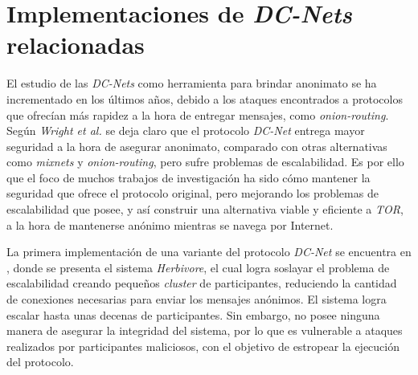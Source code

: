 \section{Implementaciones de \emph{DC-Nets} relacionadas}

El estudio de las \emph{DC-Nets} como herramienta para brindar anonimato se ha 
incrementado en los últimos años, debido a los ataques 
encontrados a protocolos que ofrecían más rapidez a la hora de entregar 
mensajes, como \emph{onion-routing}. Según \emph{Wright et al.} 
\cite{wright2002analysis} se deja claro que el protocolo \emph{DC-Net} entrega 
mayor seguridad a la hora de asegurar anonimato, comparado con otras 
alternativas como \emph{mixnets} y \emph{onion-routing}, 
pero sufre problemas de escalabilidad. Es por ello que el foco de muchos 
trabajos de investigación ha sido cómo mantener la 
seguridad que ofrece el protocolo original, pero mejorando los problemas de 
escalabilidad que posee, y así construir 
una alternativa viable y eficiente a \emph{TOR}, a la hora de mantenerse 
anónimo mientras se navega por Internet.

La primera implementación de una variante del protocolo \emph{DC-Net} se 
encuentra en \cite{goel2003herbivore}, donde se presenta el 
sistema \emph{Herbivore}, el cual logra soslayar el problema de escalabilidad 
creando pequeños \emph{cluster} de participantes, 
reduciendo la cantidad de conexiones necesarias para enviar los mensajes 
anónimos. El sistema logra escalar hasta unas decenas 
de participantes. Sin embargo, no posee ninguna manera de asegurar la 
integridad del sistema, por lo que es vulnerable a 
ataques realizados por participantes maliciosos, con el objetivo de estropear 
la ejecución del protocolo.

